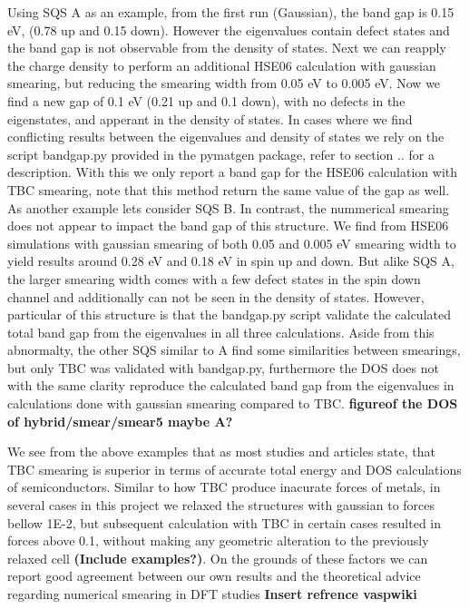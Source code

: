 Using SQS A as an example, from the first run (Gaussian), the band gap is 0.15 eV, (0.78 up and 0.15 down). However the eigenvalues contain defect states and the band gap is not observable from the density of states. Next we can reapply the charge density to perform an additional HSE06 calculation with gaussian smearing, but reducing the smearing width from 0.05 eV to 0.005 eV. Now we find a new gap of 0.1 eV (0.21 up and 0.1 down), with no defects in the eigenstates, and apperant in the density of states. In cases where we find conflicting results between the eigenvalues and density of states we rely on the script bandgap.py provided in the pymatgen package, refer to section .. for a description. With this we only report a band gap for the HSE06 calculation with TBC smearing, note that this method return the same value of the gap as well. As another example lets consider SQS B. In contrast, the nummerical smearing does not appear to impact the band gap of this structure. We find from HSE06 simulations with gaussian smearing of both 0.05 and 0.005 eV smearing width to yield results around 0.28 eV and 0.18 eV in spin up and down. But alike SQS A, the larger smearing width comes with a few defect states in the spin down channel and additionally can not be seen in the density of states. However, particular of this structure is that the bandgap.py script validate the calculated total band gap from the eigenvalues in all three calculations. Aside from this abnormalty, the other SQS similar to A find some similarities between smearings, but only TBC was validated with bandgap.py, furthermore the DOS does not with the same clarity reproduce the calculated band gap from the eigenvalues in calculations done with gaussian smearing compared to TBC. \textbf{figureof the DOS of hybrid/smear/smear5 maybe A?}

We see from the above examples that as most studies and articles state, that TBC smearing is superior in terms of accurate total energy and DOS calculations of semiconductors. Similar to how TBC produce inacurate forces of metals, in several cases in this project we relaxed the structures with gaussian to forces bellow 1E-2, but subsequent calculation with TBC in certain cases resulted in forces above 0.1, without making any geometric alteration to the previously relaxed cell \textbf{(Include examples?)}. On the grounds of these factors we can report good agreement between our own results and the theoretical advice regarding numerical smearing in DFT studies \textbf{Insert refrence vaspwiki}
 
